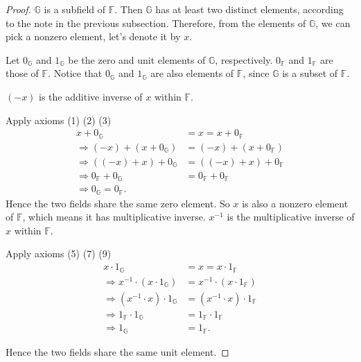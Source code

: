 \begin{proof}
	$\mathbb{G}$ is a subfield of $\mathbb{F}$. Then $\mathbb{G}$ has at least two distinct elements, according to the note in the previous subsection. Therefore, from the elements of $\mathbb{G}$, we can pick a nonzero element, let's denote it by $x$.

	Let $0_{\mathbb{G}}$ and $1_{\mathbb{G}}$ be the zero and unit elements of $\mathbb{G}$, respectively. $0_{\mathbb{F}}$ and $1_{\mathbb{F}}$ are those of $\mathbb{F}$. Notice that $0_{\mathbb{G}}$ and $1_{\mathbb{G}}$ are also elements of $\mathbb{F}$, since $\mathbb{G}$ is a subset of $\mathbb{F}$.

	$(-x)$ is the additive inverse of $x$ within $\mathbb{F}$.

	Apply axioms (1) (2) (3)
	\begin{align*}
		x + 0_{\mathbb{G}}                          & = x = x + 0_{\mathbb{F}}          \\
		\Rightarrow (-x) + (x + 0_{\mathbb{G}})     & = (-x) + (x + 0_{\mathbb{F}})     \\
		\Rightarrow ((-x) + x) + 0_{\mathbb{G}}     & = ((-x) + x) + 0_{\mathbb{F}}     \\
		\Rightarrow 0_{\mathbb{F}} + 0_{\mathbb{G}} & = 0_{\mathbb{F}} + 0_{\mathbb{F}} \\
		\Rightarrow 0_{\mathbb{G}} = 0_{\mathbb{F}}.
	\end{align*}
	Hence the two fields share the same zero element. So $x$ is also a nonzero element of $\mathbb{F}$, which means it has multiplicative inverse. $x^{-1}$ is the multiplicative inverse of $x$ within $\mathbb{F}$.

	Apply axioms (5) (7) (9)
	\begin{align*}
		x\cdot 1_{\mathbb{G}}                           & = x = x\cdot 1_{\mathbb{F}}           \\
		\Rightarrow x^{-1}\cdot (x\cdot 1_{\mathbb{G}}) & = x^{-1}\cdot (x\cdot 1_{\mathbb{F}}) \\
		\Rightarrow (x^{-1}\cdot x)\cdot 1_{\mathbb{G}} & = (x^{-1}\cdot x)\cdot 1_{\mathbb{F}} \\
		\Rightarrow 1_{\mathbb{F}}\cdot 1_{\mathbb{G}}  & = 1_{\mathbb{F}}\cdot 1_{\mathbb{F}}  \\
		\Rightarrow 1_{\mathbb{G}}                      & = 1_{\mathbb{F}}.
	\end{align*}

	Hence the two fields share the same unit element.
\end{proof}

